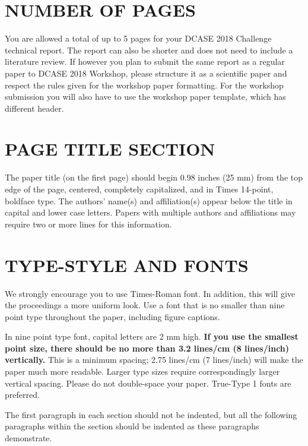 \documentclass{article}
\begin{document}
\begin{sloppy}
\section{NUMBER OF PAGES}
\label{sec:pagelimit}

You are allowed a total of up to 5 pages for your DCASE 2018 Challenge technical report. The report can also be shorter and does not need to include a literature review. If however you plan to submit the same report as a regular paper to DCASE 2018 Workshop, please structure it as a scientific paper and respect the rules given for the workshop paper formatting. 
For the workshop submission you will also have to use the workshop paper template, which has different header.

\section{PAGE TITLE SECTION}
\label{sec:pagestyle}

The paper title (on the first page) should begin 0.98 inches (25 mm) from the top edge of the page, centered, completely capitalized, and in Times 14-point, boldface type. The authors' name(s) and affiliation(s) appear below the title in capital and lower case letters.  Papers with multiple authors and affiliations may require two or more lines for this information.

\section{TYPE-STYLE AND FONTS}
\label{sec:typestyle}

We strongly encourage you to use Times-Roman font. In addition, this will give the proceedings a more uniform look. Use a font that is no smaller than nine point type throughout the paper, including figure captions.

In nine point type font, capital letters are 2 mm high. {\bf If you use the smallest point size, there should be no more than 3.2 lines/cm (8 lines/inch) vertically.} This is a minimum spacing; 2.75 lines/cm (7 lines/inch) will make the paper much more readable. Larger type sizes require correspondingly larger vertical spacing. Please do not double-space your paper. True-Type 1 fonts are preferred.

The first paragraph in each section should not be indented, but all the following paragraphs within the section should be indented as these paragraphs demonstrate.


\end{sloppy}
\end{document}
